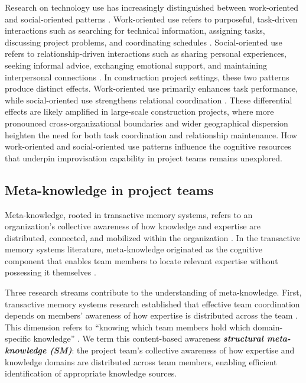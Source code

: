 \documentclass[authoryear,preprint,review,times,10pt]{elsarticle}
\begin{document}
Research on technology use has increasingly distinguished between work-oriented and social-oriented patterns \citep{ali-hassan2015Linking, cao2019Exploring}. Work-oriented use refers to purposeful, task-driven interactions such as searching for technical information, assigning tasks, discussing project problems, and coordinating schedules \citep{ma2022Investigating}. Social-oriented use refers to relationship-driven interactions such as sharing personal experiences, seeking informal advice, exchanging emotional support, and maintaining interpersonal connections \citep{ali-hassan2015Linking}. In construction project settings, these two patterns produce distinct effects. Work-oriented use primarily enhances task performance, while social-oriented use strengthens relational coordination \citep{ma2022Understanding, jiang2026Bolstering}. These differential effects are likely amplified in large-scale construction projects, where more pronounced cross-organizational boundaries and wider geographical dispersion heighten the need for both task coordination and relationship maintenance. How work-oriented and social-oriented use patterns influence the cognitive resources that underpin improvisation capability in project teams remains unexplored.

\subsection{Meta-knowledge in project teams}
Meta-knowledge, rooted in transactive memory systems, refers to an organization's collective awareness of how knowledge and expertise are distributed, connected, and mobilized within the organization \citep{wegner1987Transactive}. In the transactive memory systems literature, meta-knowledge originated as the cognitive component that enables team members to locate relevant expertise without possessing it themselves \citep{lewis2003Measuring, kush2019Conceptual}. 

Three research streams contribute to the understanding of meta-knowledge. First, transactive memory systems research established that effective team coordination depends on members' awareness of how expertise is distributed across the team \citep{wegner1987Transactive, lewis2003Measuring}. This dimension refers to ``knowing which team members hold which domain-specific knowledge'' \citep{kush2019Conceptual, ellwart2014Team}. We term this content-based awareness \textbf{\textit{structural meta-knowledge (SM)}}: the project team's collective awareness of how expertise and knowledge domains are distributed across team members, enabling efficient identification of appropriate knowledge sources. 
\end{document}
